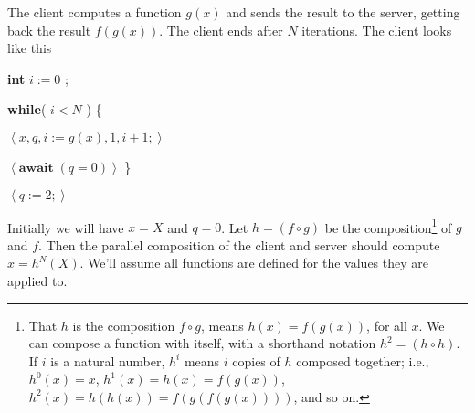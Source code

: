 \documentclass[muchmore,11pt]{article}%
\begin{document}
The client computes a function $g(x)$ and sends the result to the server,
getting back the result $f(g(x))$. The client ends after $N$ iterations. The
client looks like this

\begin{code}
\textbf{int} $i:=0$ ;

\textbf{while}( $i<N$ ) \{

\begin{indent}
\item $\left\langle x,q,i:=g(x),1,i+1;\right\rangle $

\item $\left\langle \mathbf{await\;}(q=0)\right\rangle $ \}
\end{indent}

$\left\langle q:=2;\right\rangle $
\end{code}

Initially we will have $x=X$ and $q=0$. Let $h=(f\circ g)$ be the
composition\footnote{That $h$ is the composition $f\circ g$, means
$h(x)=f(g(x))$, for all $x$. We can compose a function with itself, with a
shorthand notation $h^{2}=\left(  h\circ h\right)  $. If $i$ is a natural
number, $h^{i}$ means $i$ copies of $h$ composed together; i.e., $h^{0}(x)=x$,
$h^{1}(x)=h(x)=f(g(x))$, $h^{2}(x)=h(h(x))=f(g(f(g(x))))$, and so on. } of $g$
and $f$. Then the parallel composition of the client and server should compute
$x=h^{N}(X)$. We'll assume all functions are defined for the values they are
applied to.%
\end{document}
